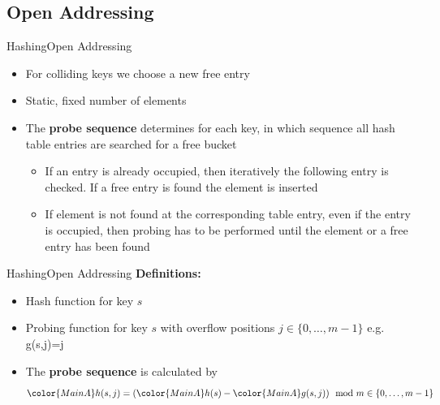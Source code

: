 
\subsection{Open Addressing}

\begin{frame}{Hashing}{Open Addressing}
  \begin{itemize}
    \item<1->
      For colliding keys we choose a new free entry
    \item<2->
      Static, fixed number of elements
    \item<3->
      The \textbf{probe sequence} determines for each key, in which sequence
      all hash table entries are searched for a free bucket
      \begin{itemize}
      \item<4->
        If an entry is already occupied, then iteratively the
        {\color{MainA}following entry} is checked.
        If a free entry is found the element is inserted
      \item<5->
        If element is not found at the corresponding table entry, even if
        the entry is occupied, then probing has to be performed until
        the element or a free entry has been found
    \end{itemize}
  \end{itemize}
\end{frame}


\begin{frame}{Hashing}{Open Addressing}
  \textbf{Definitions:}
  \begin{itemize}
    \item<2->[\color{MainA}$h(s)$]
      Hash function for key {\color{MainA}$s$}
    \item<3->[\color{MainA}$g(s,j)$]
      Probing function for key {\color{MainA}$s$}
      with overflow positions {\color{MainA}$j \in \{0,\dots,m-1\}$}
      e.g. {\color{MainA}g(s,j)=j}
    \item<4->
      The \textbf{probe sequence } is calculated by
      \begin{displaymath}
        {\color{MainA}h(s,j)}
        = ({\color{MainA}h(s)} - {\color{MainA}g(s,j)})
        \mod m \in \{0,\dots,m-1\}
      \end{displaymath}
  \end{itemize}
  \vspace{-1em}
  \begin{center}
    \begin{adjustbox}{width=0.75\linewidth}%
    \end{adjustbox}
  \end{center}
\end{frame}

